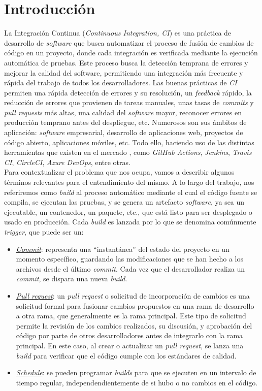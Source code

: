 \section{Introducción}
La Integración Continua (\textit{Continuous Integration, CI}) es una práctica de desarrollo de
\textit{software} que busca automatizar el proceso de fusión de cambios de código en un proyecto,
donde cada integración es verificada mediante la ejecución automática de pruebas. Este proceso
busca la detección temprana de errores y mejorar la calidad del software, permitiendo una
integración más frecuente y rápida del trabajo de todos los desarrolladores. Las buenas prácticas
de \textit{CI} \cite{8} permiten una rápida detección de errores y su resolución, un
\textit{feedback} rápido, la reducción de errores que provienen de tareas manuales, unas tasas de
\textit{commits} y \textit{pull requests} más altas, una calidad del \textit{software} mayor,
reconocer errores en producción temprano antes del despliegue, etc. Numerosos son sus ámbitos
de aplicación: \textit{software} empresarial, desarrollo de aplicaciones web, proyectos de código
abierto, aplicaciones móviles, etc. Todo ello, haciendo uso de las distintas herramientas que
existen en el mercado \cite{9}, como \textit{GitHub Actions}, \textit{Jenkins},
\textit{Travis CI}, \textit{CircleCI}, \textit{Azure DevOps}, entre otras.\\

Para contextualizar el problema que nos ocupa, vamos a describir algunos términos relevantes para
el entendimiento del mismo. A lo largo del trabajo, nos referiremos como \textit{build} al 
proceso automático mediante el cual el código fuente se compila, se ejecutan las pruebas, y se
genera un artefacto \textit{software}, ya sea un ejecutable, un contenedor, un paquete, etc., que
está listo para ser desplegado o usado en producción. Cada \textit{build} es lanzada por lo
que se denomina comúnmente \textit{trigger}, que puede ser un:
\begin{itemize}
    \item \underline{\textit{Commit}}: representa una ``instantánea'' del estado del proyecto en 
    un momento específico, guardando las modificaciones que se han hecho a los archivos desde el
    último \textit{commit}. Cada vez que el desarrollador realiza un \textit{commit}, se dispara
    una nueva \textit{build}.
    \item \underline{\textit{Pull request}}: un \textit{pull request} o solicitud de incorporación
    de cambios es una solicitud formal para fusionar cambios propuestos en una rama de desarrollo
    a otra rama, que generalmente es la rama principal. Este tipo de solicitud permite la
    revisión de los cambios realizados, su discusión, y aprobación del código por parte de
    otros desarrolladores antes de integrarlo con la rama principal. En este caso, al crear o
    actualizar un \textit{pull request}, se lanza una \textit{build} para verificar que el código
    cumple con los estándares de calidad.
    \item \underline{\textit{Schedule}}: se pueden programar \textit{builds} para que se ejecuten
    en un intervalo de tiempo regular, independendientemente de si hubo o no cambios en el código.
\end{itemize}

